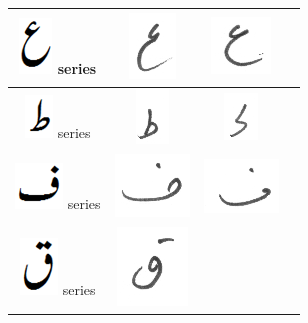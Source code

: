 \begin{table}[h]
\begin{tabular}{@{}cccc@{}}
\hline
\includegraphics[scale=0.15]{aien_orig} series & 
\includegraphics[scale=0.15]{165} & \includegraphics[scale=0.15]{166} &  \\
\hline
\includegraphics[scale=0.15]{tuay_orig} series & \includegraphics[scale=0.15]{167} & 
\includegraphics[scale=0.20]{168} &  \\
\hline
\includegraphics[scale=0.25]{fay_orig} series & \includegraphics[scale=0.25]{169} & \includegraphics[scale=0.25]{170} &  \\
\hline
\includegraphics[scale=0.20]{qaaf_orig} series & \includegraphics[scale=0.15]{171} & & \\

\end{tabular}
\end{table}
